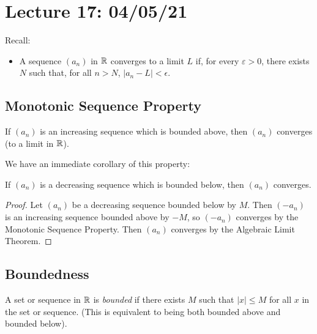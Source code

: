\section{Lecture 17: 04/05/21}

Recall:
\begin{itemize}
    \item A sequence $(a_n)$ in $\mathbb{R}$ converges to a limit $L$ if, for every $\varepsilon > 0$, there exists $N$ such that, for all $n > N$, $|a_n - L| < \epsilon$.
\end{itemize}

\subsection{Monotonic Sequence Property}

\begin{theorem}
If $(a_n)$ is an increasing sequence which is bounded above, then $(a_n)$ converges (to a limit in $\mathbb{R}$).
\end{theorem}

We have an immediate corollary of this property:
\begin{corollary}
If $(a_n)$ is a decreasing sequence which is bounded below, then $(a_n)$ converges.
\end{corollary}

\begin{proof}
Let $(a_n)$ be a decreasing sequence bounded below by $M$. Then $(-a_n)$ is an increasing sequence bounded above by $-M$, so $(-a_n)$ converges by the Monotonic Sequence Property. Then $(a_n)$ converges by the Algebraic Limit Theorem.
\end{proof}

\subsection{Boundedness}

\begin{definition}[Boundedness]
A set or sequence in $\mathbb{R}$ is \textit{bounded} if there exists $M$ such that $|x| \le M$ for all $x$ in the set or sequence. (This is equivalent to being both bounded above and bounded below).
\end{definition}

